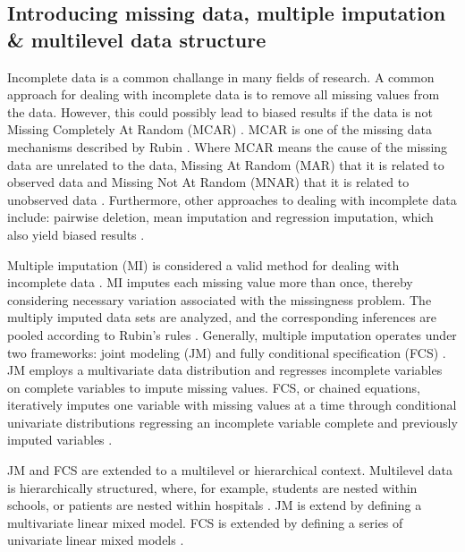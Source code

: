 \documentclass[10pt, a4paper, titlepage]{article}
\begin{document}
\subsection{Introducing missing data, multiple imputation \& multilevel data structure}
Incomplete data is a common challange in many fields of research. A common approach for dealing with incomplete data is to remove all missing values from the data. However, this could possibly lead to biased results if the data is not Missing Completely At Random (MCAR) \cite{buurenFlexibleImputationMissing2018, kang2013, enders2017, austin2021}. MCAR is one of the missing data mechanisms described by Rubin \cite{rubin1976}. Where MCAR means the cause of the missing data are unrelated to the data, Missing At Random (MAR) that it is related to observed data and Missing Not At Random (MNAR) that it is related to unobserved data \cite{buurenFlexibleImputationMissing2018, rubin1976}. Furthermore, other approaches to dealing with incomplete data include: pairwise deletion, mean imputation and regression imputation, which also yield biased results \cite{buurenFlexibleImputationMissing2018}.

Multiple imputation (MI) is considered a valid method for dealing with incomplete data \cite{mistlerComparisonJointModel2017, buurenFlexibleImputationMissing2018, enders2017, burgette2010, austin2021, audigier2018, vanbuuren2007, grund2021, hughes2014}. MI imputes each missing value more than once, thereby considering necessary variation associated with the missingness problem. The multiply imputed data sets are analyzed, and the corresponding inferences are pooled according to Rubin's rules \cite{buurenFlexibleImputationMissing2018, austin2021, rubin1987}.
Generally, multiple imputation operates under two frameworks: joint modeling (JM) and fully conditional specification (FCS) \cite{mistlerComparisonJointModel2017, buurenFlexibleImputationMissing2018, enders2018, enders2018a, hughes2014}. JM employs a multivariate data distribution and regresses incomplete variables on complete variables to impute missing values. FCS, or chained equations, iteratively imputes one variable with missing values at a time through conditional univariate distributions regressing an incomplete variable complete and previously imputed variables \cite{mistlerComparisonJointModel2017, buurenFlexibleImputationMissing2018, enders2018, enders2018a, hughes2014}.

JM and FCS are extended to a multilevel or hierarchical context. Multilevel data is hierarchically structured, where, for example, students are nested within schools, or patients are nested within hospitals \cite{hox2017}. JM is extend by defining a multivariate linear mixed model. FCS is extended by defining a series of univariate linear mixed models \cite{mistlerComparisonJointModel2017}.
\end{document}
